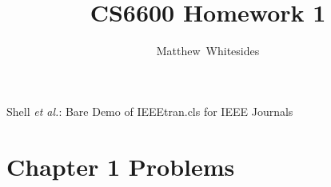 \documentclass[journal,onecolumn]{IEEEtran}
\begin{document}
%
\title{CS6600 Homework 1}

%
%
%
\author{Matthew~Whitesides}%

%
{Shell \MakeLowercase{\textit{et al.}}: Bare Demo of IEEEtran.cls for IEEE Journals}

\maketitle


\IEEEpeerreviewmaketitle

\section{Chapter 1 Problems}
\end{document}

